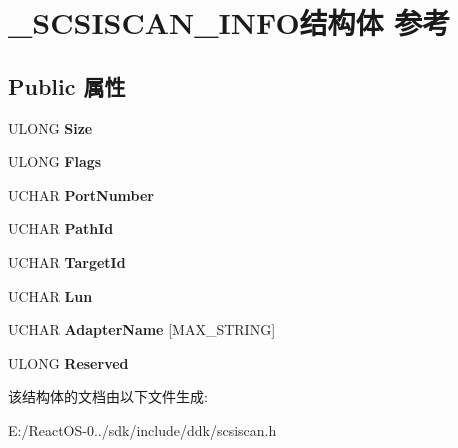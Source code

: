 \hypertarget{struct___s_c_s_i_s_c_a_n___i_n_f_o}{}\section{\+\_\+\+S\+C\+S\+I\+S\+C\+A\+N\+\_\+\+I\+N\+F\+O结构体 参考}
\label{struct___s_c_s_i_s_c_a_n___i_n_f_o}
\subsection*{Public 属性}
\begin{DoxyCompactItemize}
\item 
\mbox{\label{struct___s_c_s_i_s_c_a_n___i_n_f_o_afe1f0f1e85d50a35ad0161244eaeeb7d}} 
U\+L\+O\+NG {\bfseries Size}
\item 
\mbox{\label{struct___s_c_s_i_s_c_a_n___i_n_f_o_a5cdc4fb9183794160fdc15a4d6847808}} 
U\+L\+O\+NG {\bfseries Flags}
\item 
\mbox{\label{struct___s_c_s_i_s_c_a_n___i_n_f_o_a6b3b06a18f6c72d6e9861db75a996372}} 
U\+C\+H\+AR {\bfseries Port\+Number}
\item 
\mbox{\label{struct___s_c_s_i_s_c_a_n___i_n_f_o_a64afa7d6889b6c93c989378f2458b88d}} 
U\+C\+H\+AR {\bfseries Path\+Id}
\item 
\mbox{\label{struct___s_c_s_i_s_c_a_n___i_n_f_o_a73f9922e3cf82eb19fe84218c5e1a6fb}} 
U\+C\+H\+AR {\bfseries Target\+Id}
\item 
\mbox{\label{struct___s_c_s_i_s_c_a_n___i_n_f_o_a4d0cb2ebfb0f59767b3288dad1b88e10}} 
U\+C\+H\+AR {\bfseries Lun}
\item 
\mbox{\label{struct___s_c_s_i_s_c_a_n___i_n_f_o_ada64e5388e84c9af0135040a732a5b56}} 
U\+C\+H\+AR {\bfseries Adapter\+Name} \mbox{[}M\+A\+X\+\_\+\+S\+T\+R\+I\+NG\mbox{]}
\item 
\mbox{\label{struct___s_c_s_i_s_c_a_n___i_n_f_o_a831e58588578bf40c010870c3fdb3acb}} 
U\+L\+O\+NG {\bfseries Reserved}
\end{DoxyCompactItemize}


该结构体的文档由以下文件生成\+:\begin{DoxyCompactItemize}
\item 
E\+:/\+React\+O\+S-\/0../sdk/include/ddk/scsiscan.\+h\end{DoxyCompactItemize}
